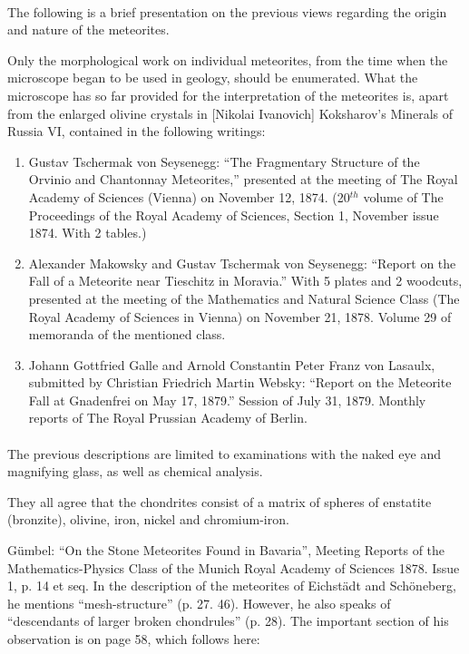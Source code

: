 \documentclass[a4paper, 12pt, oneside]{article}
\begin{document}
\paragraph{}
The following is a brief presentation on the previous views regarding the origin and nature of the meteorites.

Only the morphological work on individual meteorites, from the time when the microscope began to be used in geology, should be enumerated. What the microscope has so far provided for the interpretation of the meteorites is, apart from the enlarged olivine crystals in [Nikolai Ivanovich] Koksharov's Minerals of Russia VI, contained in the following writings:
\begin{enumerate}
    \item Gustav Tschermak von Seysenegg: ``The Fragmentary Structure of the Orvinio and Chantonnay Meteorites,'' presented at the meeting of The Royal Academy of Sciences (Vienna) on November 12, 1874. (20$^{th}$ volume of The Proceedings of the Royal Academy of Sciences, Section 1, November issue 1874. With 2 tables.)
    \item Alexander Makowsky and Gustav Tschermak von Seysenegg: ``Report on the Fall of a Meteorite near Tieschitz in Moravia.'' With 5 plates and 2 woodcuts, presented at the meeting of the Mathematics and Natural Science Class (The Royal Academy of Sciences in Vienna) on November 21, 1878. Volume 29 of memoranda of the mentioned class.
    \item Johann Gottfried Galle and Arnold Constantin Peter Franz von Lasaulx, submitted by Christian Friedrich Martin Websky: ``Report on the Meteorite Fall at Gnadenfrei on May 17, 1879.'' Session of July 31, 1879. Monthly reports of The Royal Prussian Academy of Berlin.
\end{enumerate}
\paragraph{}
The previous descriptions are limited to examinations with the naked eye and magnifying glass, as well as chemical analysis.

They all agree that the chondrites consist of a matrix of spheres of enstatite (bronzite), olivine, iron, nickel and chromium-iron.

Gümbel: ``On the Stone Meteorites Found in Bavaria'', Meeting Reports of the Mathematics-Physics Class of the Munich Royal Academy of Sciences 1878. Issue 1, p. 14 et seq. In the description of the meteorites of Eichstädt and Schöneberg, he mentions ``mesh-structure'' (p. 27. 46). However, he also speaks of ``descendants of larger broken chondrules'' (p. 28). The important section of his observation is on page 58, which follows here:
\end{document}
